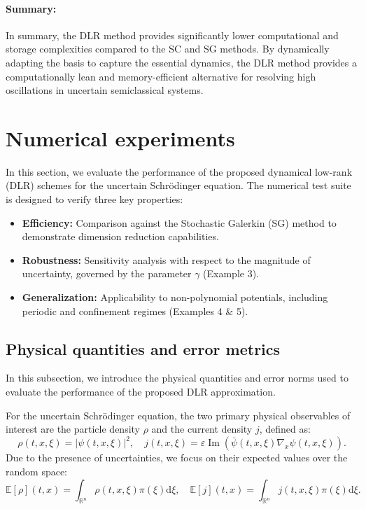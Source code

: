 \documentclass[preprint,11pt]{elsarticle}
\begin{document}
\paragraph{Summary:}
In summary, the DLR method provides significantly lower computational and storage complexities compared to the SC and SG methods. By dynamically adapting the basis to capture the essential dynamics, the DLR method provides a computationally lean and memory-efficient alternative for resolving high oscillations in uncertain semiclassical systems.






\section{Numerical experiments}
\label{Sec: Numerical}

In this section, we evaluate the performance of the proposed dynamical low-rank (DLR) schemes for the uncertain Schrödinger equation. The numerical test suite is designed to verify three key properties:
\begin{itemize}
    \item \textbf{Efficiency:} Comparison against the Stochastic Galerkin (SG) method to demonstrate dimension reduction capabilities.
    \item \textbf{Robustness:} Sensitivity analysis with respect to the magnitude of uncertainty, governed by the parameter $\gamma$ (Example 3).
    \item \textbf{Generalization:} Applicability to non-polynomial potentials, including periodic and confinement regimes (Examples 4 \& 5).
\end{itemize}


\subsection{Physical quantities and error metrics}

In this subsection, we introduce the physical quantities and error norms used to evaluate the performance of the proposed DLR approximation. 

For the uncertain Schrödinger equation, the two primary physical observables of interest are the particle density $\rho$ and the current density $j$, defined as:
\begin{equation}
    \rho(t, x, \xi) = |\psi(t, x, \xi)|^2, \quad j(t, x, \xi) = \varepsilon \operatorname{Im} \left( \bar{\psi}(t, x, \xi) \nabla_x \psi(t, x, \xi) \right).
\end{equation}
Due to the presence of uncertainties, we focus on their expected values over the random space:
\begin{equation}
    \mathbb{E}[\rho](t, x) = \int_{\mathbb{R}^n} \rho(t, x, \xi) \pi(\xi) \mathrm{d}\xi, \quad \mathbb{E}[j](t, x) = \int_{\mathbb{R}^n} j(t, x, \xi) \pi(\xi) \mathrm{d}\xi.
\end{equation}
\end{document}
